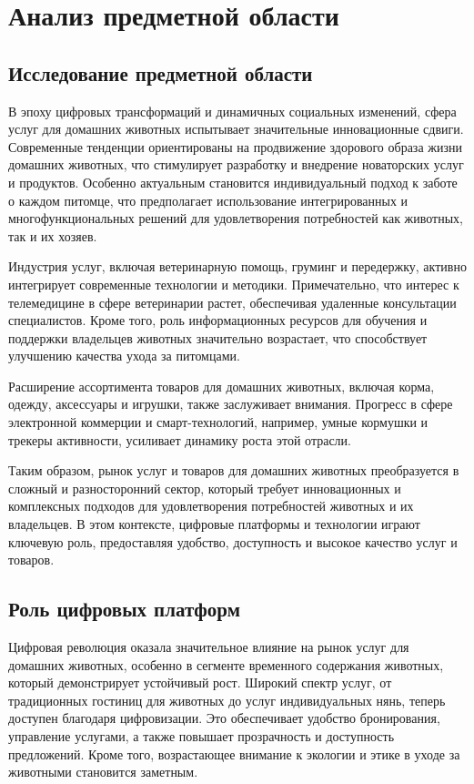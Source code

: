 \section{Анализ предметной области}

\subsection{Исследование предметной области}

В эпоху цифровых трансформаций и динамичных социальных изменений, сфера услуг для домашних животных испытывает значительные инновационные сдвиги. Современные тенденции ориентированы на продвижение здорового образа жизни домашних животных, что стимулирует разработку и внедрение новаторских услуг и продуктов. Особенно актуальным становится индивидуальный подход к заботе о каждом питомце, что предполагает использование интегрированных и многофункциональных решений для удовлетворения потребностей как животных, так и их хозяев.

Индустрия услуг, включая ветеринарную помощь, груминг и передержку, активно интегрирует современные технологии и методики. Примечательно, что интерес к телемедицине в сфере ветеринарии растет, обеспечивая удаленные консультации специалистов. Кроме того, роль информационных ресурсов для обучения и поддержки владельцев животных значительно возрастает, что способствует улучшению качества ухода за питомцами.

Расширение ассортимента товаров для домашних животных, включая корма, одежду, аксессуары и игрушки, также заслуживает внимания. Прогресс в сфере электронной коммерции и смарт-технологий, например, умные кормушки и трекеры активности, усиливает динамику роста этой отрасли.

Таким образом, рынок услуг и товаров для домашних животных преобразуется в сложный и разносторонний сектор, который требует инновационных и комплексных подходов для удовлетворения потребностей животных и их владельцев. В этом контексте, цифровые платформы и технологии играют ключевую роль, предоставляя удобство, доступность и высокое качество услуг и товаров.

\subsection{Роль цифровых платформ}

Цифровая революция оказала значительное влияние на рынок услуг для домашних животных, особенно в сегменте временного содержания животных, который демонстрирует устойчивый рост. Широкий спектр услуг, от традиционных гостиниц для животных до услуг индивидуальных нянь, теперь доступен благодаря цифровизации. Это обеспечивает удобство бронирования, управление услугами, а также повышает прозрачность и доступность предложений. Кроме того, возрастающее внимание к экологии и этике в уходе за животными становится заметным.

